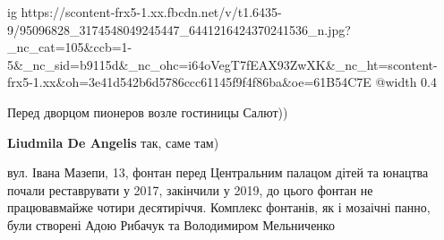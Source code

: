  
 
 
 
 

\ifcmt
  ig https://scontent-frx5-1.xx.fbcdn.net/v/t1.6435-9/95096828_3174548049245447_6441216424370241536_n.jpg?_nc_cat=105&ccb=1-5&_nc_sid=b9115d&_nc_ohc=i64oVegT7fEAX93ZwXK&_nc_ht=scontent-frx5-1.xx&oh=3e41d542b6d5786ccc61145f9f4f86ba&oe=61B54C7E
  @width 0.4
\fi

Перед дворцом пионеров возле гостиницы Салют))

\textbf{Liudmila De Angelis} так, саме там)


вул. Івана Мазепи, 13, фонтан перед Центральним палацом дітей та юнацтва почали
реставрувати у 2017, закінчили у 2019, до цього фонтан не працювавмайже чотири
десятиріччя. Комплекс фонтанів, як і мозаічні панно, були створені Адою Рибачук
та Володимиром Мельниченко
